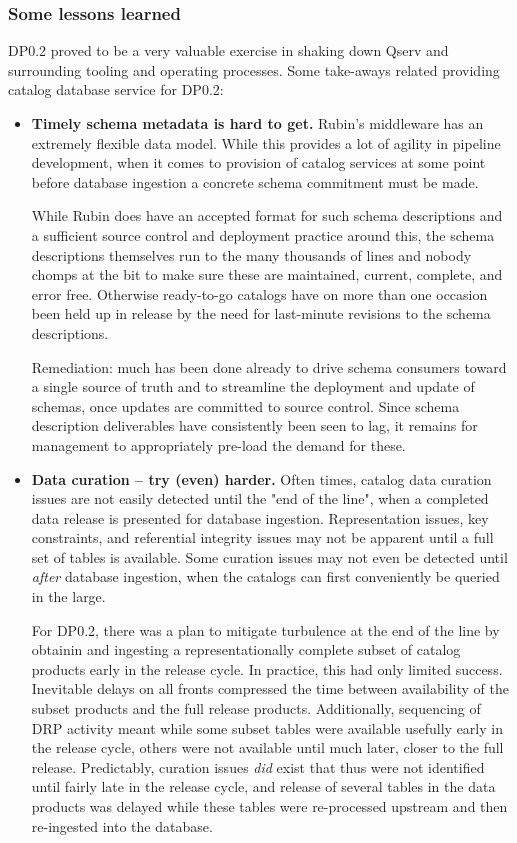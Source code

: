 \subsubsection{Some lessons learned}

DP0.2 proved to be a very valuable exercise in shaking down Qserv and surrounding tooling and operating
processes.  Some take-aways related providing catalog database service for DP0.2:

\begin{itemize}

\item
  \textbf{Timely schema metadata is hard to get.}  Rubin's middleware has an extremely flexible data
  model.  While this provides a lot of agility in pipeline development, when it comes to provision of
  catalog services at some point before database ingestion a concrete schema commitment must be made.

  While Rubin does have an accepted format for such schema descriptions and a sufficient source control and
  deployment practice around this, the schema descriptions themselves run to the many thousands of lines and
  nobody chomps at the bit to make sure these are maintained, current, complete, and error free.  Otherwise
  ready-to-go catalogs have on more than one occasion been held up in release by the need for last-minute
  revisions to the schema descriptions.

  Remediation: much has been done already to drive schema consumers toward a single source of truth and to
  streamline the deployment and update of schemas, once updates are committed to source control.  Since
  schema description deliverables have consistently been seen to lag, it remains for management to
  appropriately pre-load the demand for these.

\item
  \textbf{Data curation -- try (even) harder.}  Often times, catalog data curation issues are not easily
  detected until the "end of the line", when a completed data release is presented for database ingestion.
  Representation issues, key constraints, and referential integrity issues may not be apparent until a full
  set of tables is available.  Some curation issues may not even be detected until \emph{after} database
  ingestion, when the catalogs can first conveniently be queried in the large.

  For DP0.2, there was a plan to mitigate turbulence at the end of the line by obtainin and ingesting a
  representationally complete subset of catalog products early in the release cycle.  In practice, this had
  only limited success.  Inevitable delays on all fronts compressed the time between availability of the
  subset products and the full release products.  Additionally, sequencing of DRP activity meant while some
  subset tables were available usefully early in the release cycle, others were not available until much
  later, closer to the full release.  Predictably, curation issues \emph{did} exist that thus were not
  identified until fairly late in the release cycle, and release of several tables in the data products was
  delayed while these tables were re-processed upstream and then re-ingested into the database.


\end{itemize}
